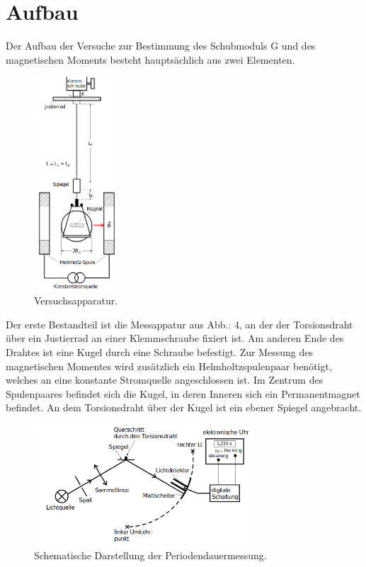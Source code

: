 \newpage
\section{Aufbau}

Der Aufbau der Versuche zur Bestimmung des Schubmoduls G und des magnetischen Moments besteht hauptsächlich aus zwei Elementen.

\begin{figure}[h]
  \centering
  \includegraphics[height=8cm]{Grafiken/Magnetfeld.pdf}
  \caption{Versuchsapparatur\cite{1}.}
  \label{fig:Versuch}
\end{figure}

Der erste Bestandteil ist die Messappatur aus Abb.: 4, an der der Torsionsdraht über ein Justierrad an einer Klemmschraube fixiert ist.
Am anderen Ende des Drahtes ist eine Kugel durch eine Schraube befestigt.
Zur Messung des magnetischen Momentes wird zusätzlich ein Helmholtzspulenpaar benötigt, welches an eine konstante Stromquelle angeschlossen ist.
Im Zentrum des Spulenpaares befindet sich die Kugel, in deren Inneren sich ein Permanentmagnet befindet.
An dem Torsionsdraht über der Kugel ist ein ebener Spiegel angebracht.

\begin{figure}[h]
  \centering
  \includegraphics[height=4.5cm]{Grafiken/Periodendauermessung.pdf}
  \caption{Schematische Darstellung der Periodendauermessung.}
  \label{fig:Periodendauer}
\end{figure} 

